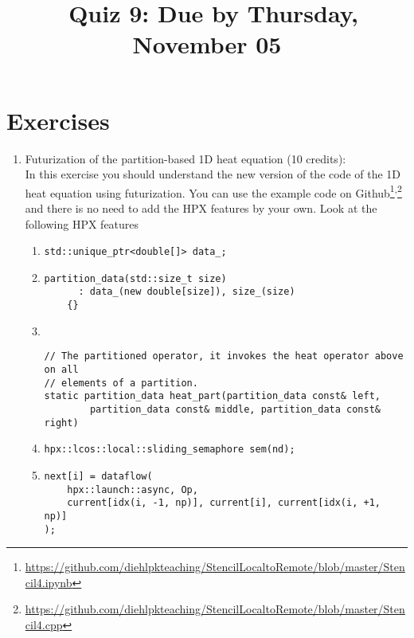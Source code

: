 \documentclass[11pt]{article}
\begin{document}
\title{\coursename~Quiz 9: Due by Thursday, November 05}
\date{}
\maketitle

\medskip


\section*{Exercises}

\begin{enumerate}
\item Futurization of the partition-based 1D heat equation (10 credits): \\
In this exercise you should understand the new version of the code of the 1D heat equation using futurization. You can use the example code on Github\footnote{\url{https://github.com/diehlpkteaching/StencilLocaltoRemote/blob/master/Stencil4.ipynb}}\textsuperscript{,}\footnote{\url{https://github.com/diehlpkteaching/StencilLocaltoRemote/blob/master/Stencil4.cpp}} and there is no need to add the HPX features by your own. Look at the following HPX features
\begin{enumerate}
\item \lstinline|std::unique_ptr<double[]> data_;|
\item \begin{lstlisting}
partition_data(std::size_t size)
      : data_(new double[size]), size_(size)
    {}
\end{lstlisting} 
\item \textcolor{white}{test}

\begin{lstlisting}
// The partitioned operator, it invokes the heat operator above on all
// elements of a partition.
static partition_data heat_part(partition_data const& left,
        partition_data const& middle, partition_data const& right)
\end{lstlisting}

\item \lstinline|hpx::lcos::local::sliding_semaphore sem(nd);|

\item \begin{lstlisting}
next[i] = dataflow(
    hpx::launch::async, Op,
    current[idx(i, -1, np)], current[i], current[idx(i, +1, np)]
);
\end{lstlisting}


\end{enumerate}
\end{enumerate}
\end{document}
